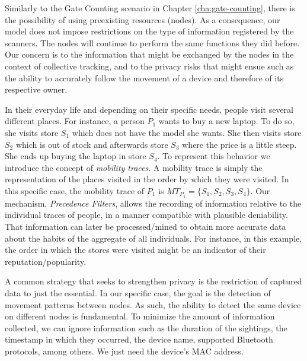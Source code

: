 Similarly to the Gate Counting scenario in Chapter
\ref{cha:gate-counting}, there is the possibility of using preexisting
resources (nodes). As a consequence, our model does not impose
restrictions on the type of information registered by the
scanners. The nodes will continue to perform the same functions they
did before. Our concern is to the information that
might be exchanged by the nodes in the context of collective tracking,
 and to the privacy risks that might ensue such as the ability
to accurately follow the movement of a device and therefore of its
respective owner.

In their everyday life and depending on their specific needs, people
visit several different places. For instance, a person $P_1$ wants to
buy a new laptop. To do so, she visits store $S_1$ which does not have
the model she wants. She then visits store $S_2$ which is out of
stock and afterwards store $S_3$ where the price is a little
steep. She ends up buying the laptop in store $S_4$. To represent this
behavior we introduce the concept of \emph{mobility traces}. A
mobility trace is simply the representation of the places visited in the
order by which they were visited. In this specific case, the mobility
trace of $P_1$ is $MT_{P_1}=\{S_1,S_2,S_3,S_4\}$. Our mechanism,
\emph{Precedence Filters}, allows the recording of information
relative to the individual traces of people, in a manner compatible
with plausible deniability. That information can later be
processed/mined to obtain more accurate data about the habits of the
aggregate of all individuals. For instance, in this example, the order
in which the stores were visited might be an indicator of their
reputation/popularity.

A common strategy that seeks to strengthen privacy is the restriction
of captured data to just the essential. In our specific case, the goal
is the detection of movement patterns between nodes. As such, the
ability to detect the same device on different nodes is fundamental. To
minimize the amount of information collected, we can ignore
information such as the duration of the sightings, the timestamp in which
they occurred, the device name, supported Bluetooth protocols,
among others. We just need the device's MAC address.

